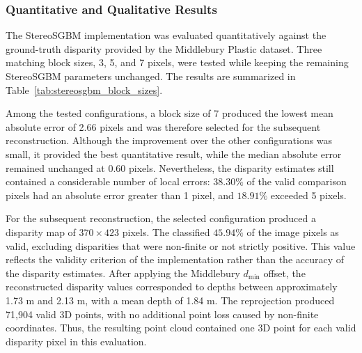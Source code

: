 \subsubsection{Quantitative and Qualitative Results}

The StereoSGBM implementation was evaluated quantitatively against the ground-truth disparity provided by the Middlebury Plastic dataset. Three matching block sizes, 3, 5, and 7 pixels, were tested while keeping the remaining StereoSGBM parameters unchanged. The results are summarized in Table~\ref{tab:stereosgbm_block_sizes}.

\begin{table}[H]
\centering
\caption{StereoSGBM disparity accuracy for different block sizes on the Middlebury Plastic dataset.}
\label{tab:stereosgbm_block_sizes}
\end{table}

Among the tested configurations, a block size of 7 produced the lowest mean absolute error of 2.66 pixels and was therefore selected for the subsequent reconstruction. Although the improvement over the other configurations was small, it provided the best quantitative result, while the median absolute error remained unchanged at 0.60 pixels. Nevertheless, the disparity estimates still contained a considerable number of local errors: \(38.30\%\) of the valid comparison pixels had an absolute error greater than 1 pixel, and \(18.91\%\) exceeded 5 pixels.

For the subsequent reconstruction, the selected configuration produced a disparity map of \(370\times423\) pixels. The  classified \(45.94\%\) of the image pixels as valid, excluding disparities that were non-finite or not strictly positive. This value reflects the validity criterion of the implementation rather than the accuracy of the disparity estimates.
After applying the Middlebury \(d_{\min}\) offset, the reconstructed disparity values corresponded to depths between approximately 1.73 m and 2.13 m, with a mean depth of 1.84 m. The reprojection produced 71,904 valid 3D points, with no additional point loss caused by non-finite coordinates. Thus, the resulting point cloud contained one 3D point for each valid disparity pixel in this evaluation.


